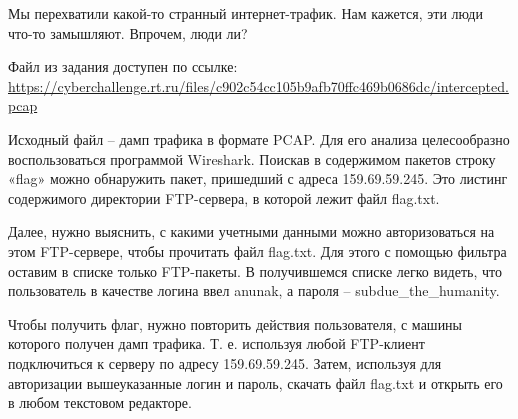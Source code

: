 
Мы перехватили какой-то странный интернет-трафик. Нам кажется, эти люди что-то замышляют. Впрочем, люди ли?

Файл из задания доступен по ссылке: \url{https://cyberchallenge.rt.ru/files/c902c54cc105b9afb70ffc469b0686dc/intercepted.pcap}

\solutionSection

Исходный файл – дамп трафика в формате PCAP. Для его анализа целесообразно воспользоваться программой Wireshark. Поискав в содержимом пакетов строку «flag» можно обнаружить пакет, пришедший с адреса 159.69.59.245. Это листинг содержимого директории FTP-сервера, в которой лежит файл flag.txt.


Далее, нужно выяснить, с какими учетными данными можно авторизоваться на этом FTP-сервере, чтобы прочитать файл flag.txt. Для этого с помощью фильтра оставим в списке только FTP-пакеты. В получившемся списке легко видеть, что пользователь в качестве логина ввел anunak, а пароля – subdue\_the\_humanity.


Чтобы получить флаг, нужно повторить действия пользователя, с машины которого получен дамп трафика. Т. е. используя любой FTP-клиент подключиться к серверу по адресу 159.69.59.245. Затем, используя для авторизации вышеуказанные логин и пароль, скачать файл flag.txt и открыть его в любом текстовом редакторе.

